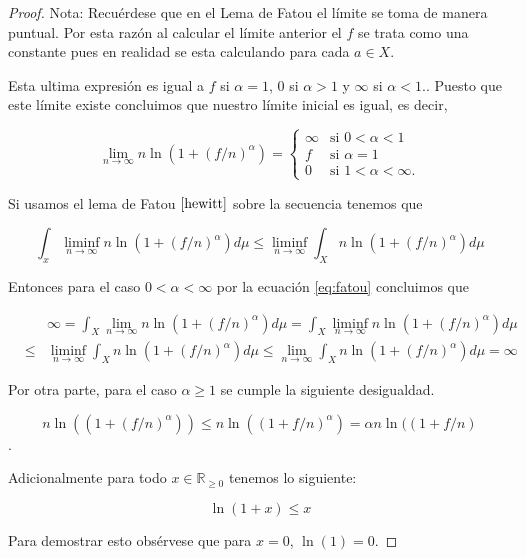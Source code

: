 \documentclass[letter,twoside,12pt]{article}
\numberwithin{equation}{section}
\begin{document}
\begin{enumerate}[label = (\textbf{\arabic*.})]
\begin{proof}
Nota: Recuérdese que en el Lema de Fatou el límite se toma de manera puntual. Por esta razón al calcular el límite anterior el $f$ se trata como una constante pues en realidad se esta calculando para cada $a \in X$.

Esta ultima expresión es igual a $f$ si $\alpha = 1 $, 0 si $\alpha > 1$ y $\infty $ si $ \alpha<1. $. Puesto que este límite existe concluimos que nuestro límite inicial es igual, es decir,

\begin{equation}
\lim_{n \to \infty} n\ln(1+(f/n)^\alpha) = \left\{
	\begin{array}{ll}
		\infty  & \mbox{si } 0 < \alpha < 1 
		 \\ f & \mbox{si } \alpha = 1
		 \\ 0 & \mbox{si } 1 < \alpha < \infty.
	\end{array}
\right. \label{eq:lim}
\end{equation}

Si usamos el lema de Fatou $ \cite[12.23]{hewitt} $ sobre la secuencia tenemos que

\begin{equation} \label{eq:fatou}
 \int_x \liminf_{n \to \infty} n\ln(1+(f/n)^\alpha)d\mu \leq \liminf_{n \to \infty} \int_X n\ln(1+(f/n)^\alpha)d\mu
\end{equation}

Entonces para el caso $ 0 < \alpha < \infty $ por la ecuación \eqref{eq:fatou} concluimos que

\begin{eqnarray*}
& &\infty = \int_X \lim_{n \to \infty} n\ln(1+(f/n)^\alpha)d\mu = \int_X \liminf_{n \to \infty} n\ln(1+(f/n)^\alpha)d\mu
\\&\leq&  \liminf_{n \to \infty} \int_X n\ln(1+(f/n)^\alpha)d\mu \leq \lim_{n \to \infty} \int_X n\ln(1+(f/n)^\alpha)d\mu = \infty
\end{eqnarray*} 

Por otra parte, para el caso $ \alpha \geq 1 $ se cumple la siguiente desigualdad.

$$ n\ln((1+(f/n)^\alpha)) \leq n\ln((1+f/n)^\alpha) = \alpha n\ln((1+f/n) $$.

Adicionalmente para todo $x \in \mathbb{R}_{\geq0} $ tenemos lo siguiente:

\begin{equation}
\ln(1+x)\leq x \label{eq:ln}
\end{equation}

Para demostrar esto obsérvese que para $ x=0 $, $ \ln(1) = 0 $.


\end{proof}
\end{enumerate}
\end{document}
